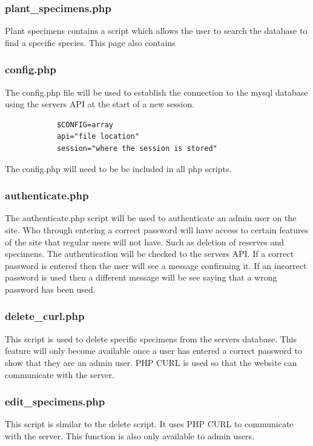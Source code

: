         
    \subsubsection{plant\_specimens.php}
        Plant specimens contains a script which allows the user to search the database to find a specific species. This page also contains 


    \subsubsection{config.php}
        The config.php file will be used to establish the connection to the mysql database using the servers API at the start of a new session.
        \begin{verbatim}
            $CONFIG=array
            api="file location"
            session="where the session is stored"
        \end{verbatim}
        The config.php will need to be be included in all php scripts.


    \subsubsection{authenticate.php}
        The authenticate.php script will be used to authenticate an admin user on the site. Who through entering a correct password will have access to certain features of the site that regular users will not have. Such as deletion of reserves and specimens. The authentication will be checked to the servers API. If a correct password is entered then the user will see a message confirming it. If an incorrect password is used then a different message will be see saying that a wrong password has been used.


    \subsubsection{delete\_curl.php}
        This script is used to delete specific specimens from the servers database. This feature will only become available once a user has entered a correct password to show that they are an admin user. PHP CURL is used so that the website can communicate with the server.


    \subsubsection{edit\_specimens.php}
        This script is similar to the delete script. It uses PHP CURL to communicate with the server. This function is also only available to admin users.



